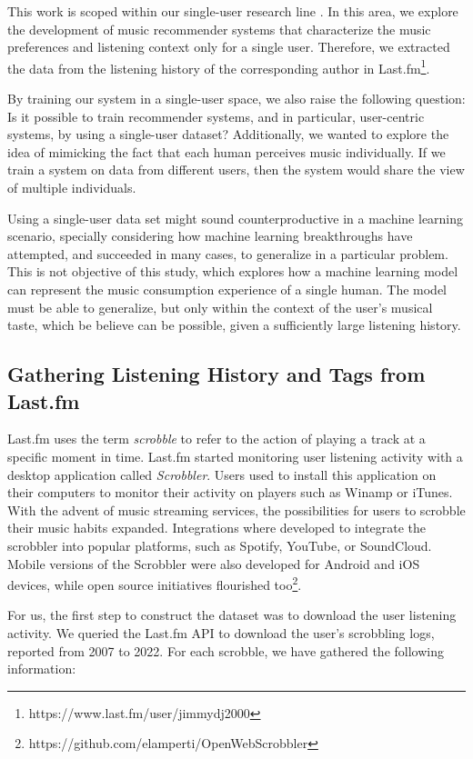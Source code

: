 \documentclass[sn-mathphys]{sn-jnl}%
\theoremstyle{thmstyleone}%
\theoremstyle{thmstyletwo}%
\theoremstyle{thmstylethree}%
\begin{document}
This work is scoped within our single-user research line \cite{ramirez2022user}.
In this area, we explore the development of music recommender systems that
characterize the music preferences and listening context only for a single user.
Therefore, we extracted the data from the
listening history of the corresponding author in Last.fm\footnote[5]{https://www.last.fm/user/jimmydj2000}.

By training our system in a single-user space, we also raise the following question: Is it possible to train
recommender systems, and in particular, user-centric systems, by using a single-user dataset?
Additionally, we wanted to explore the idea of mimicking the fact that each human perceives music individually.
If we train a system on data from different users, then the system would share the view of multiple individuals.

Using a single-user data set might sound counterproductive in a machine learning scenario, specially considering
how machine learning breakthroughs have attempted, and succeeded in many cases, to generalize in a particular problem.
This is not objective of this study, which explores how a machine learning model can represent the music consumption experience of a single human.
The model must be able to generalize, but only within the context of the user's musical taste, which be believe can be possible, given a sufficiently large listening history.


\subsection{Gathering Listening History and Tags from Last.fm}

Last.fm uses the term \emph{scrobble} to refer to the action of playing a track at a specific moment in time.
Last.fm started monitoring user listening activity with a desktop application called \emph{Scrobbler}.
Users used to install this application on their computers to monitor their activity on players such as Winamp or iTunes.
With the advent of music streaming services, the possibilities for users to scrobble their music habits expanded.
Integrations where developed to integrate the scrobbler into popular platforms,
such as Spotify, YouTube, or SoundCloud.
Mobile versions of the Scrobbler were also developed for Android and iOS devices, while open source initiatives flourished too\footnote[6]{https://github.com/elamperti/OpenWebScrobbler}.


For us, the first step to construct the dataset was to download the user listening activity.
We queried the Last.fm API to download the user{'}s scrobbling logs, reported from 2007 to 2022.
For each scrobble, we have gathered the following information:
\end{document}
